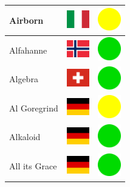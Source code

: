 \documentclass[12pt, a4paper, twoside]{report}
\begin{document}
\begin{center}
\begin{longtable}{|p{5cm}|p{2cm}|p{2cm}|}
 Airborn                                                    & \includegraphics[width=1cm]{../img/flags/it} &   \includegraphics[width=1cm]{../likes/m} \\ \hline
 Alfahanne                                                  & \includegraphics[width=1cm]{../img/flags/no} &   \includegraphics[width=1cm]{../likes/y} \\ \hline
 Algebra                                                    & \includegraphics[width=1cm]{../img/flags/ch} &   \includegraphics[width=1cm]{../likes/y} \\ \hline
 Al Goregrind                                               & \includegraphics[width=1cm]{../img/flags/de} &   \includegraphics[width=1cm]{../likes/m} \\ \hline
 Alkaloid                                                   & \includegraphics[width=1cm]{../img/flags/de} &   \includegraphics[width=1cm]{../likes/y} \\ \hline
 All its Grace                                              & \includegraphics[width=1cm]{../img/flags/de} &   \includegraphics[width=1cm]{../likes/y} \\ \hline

\end{longtable}
\end{center}
\end{document}
